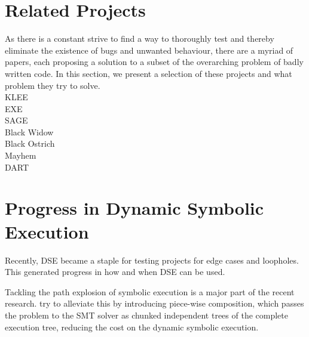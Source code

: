 \section{Related Projects}

As there is a constant strive to find a way to thoroughly test and thereby eliminate the existence of bugs and unwanted behaviour, there are a myriad of papers, each proposing a solution to a subset of the overarching problem of badly written code.  In this section, we present a selection of these projects and what problem they try to solve.\\
KLEE \cite{cadar_klee_nodate}\\
EXE \cite{ball_deconstructing_nodate}\\
SAGE \cite{godefroid_sage_2012}\\
Black Widow \cite{eriksson_black_2021}\\
Black Ostrich \cite{eriksson_black_2023}\\
Mayhem \cite{cha_unleashing_2012}\\
DART  \cite{godefroid_random_2007}\\
\section{Progress in Dynamic Symbolic Execution}

Recently, DSE became a staple for testing projects for edge cases and loopholes. 
This generated progress in how and when DSE can be used. 

Tackling the path explosion of symbolic execution is a  major part of the recent research.
\citet{ryan_countering_nodate} try to alleviate this by introducing piece-wise composition, which passes the problem to the SMT solver as chunked independent trees of the complete execution tree, reducing the cost on the dynamic symbolic execution.